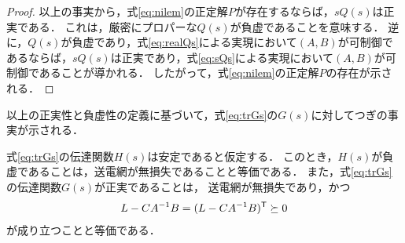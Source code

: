 \documentclass[a4j,10pt,oneside,openany,dvipdfmx]{jsbook}
\begin{document}
\begin{proof}
以上の事実から，式\eqref{eq:nilem}の正定解$P$が存在するならば，$sQ(s)$は正実である．
これは，厳密にプロパーな$Q(s)$が負虚であることを意味する．
逆に，$Q(s)$が負虚であり，式\eqref{eq:realQs}による実現において$(A,B)$が可制御であるならば，$sQ(s)$は正実であり，式\eqref{eq:sQs}による実現において$(A,B)$が可制御であることが導かれる．
したがって，式\eqref{eq:nilem}の正定解$P$の存在が示される．
\proofend
\end{proof}

以上の正実性と負虚性の定義に基づいて，式\eqref{eq:trGs}の$G(s)$に対してつぎの事実が示される．

\begin{theorem}\label{thm:EdynNI}
式\eqref{eq:trGs}の伝達関数$H(s)$は安定であると仮定する．
このとき，$H(s)$が負虚であることは，送電網が無損失であることと等価である．
また，式\eqref{eq:trGs}の伝達関数$G(s)$が正実であることは，
送電網が無損失であり，かつ
\begin{equation}\label{eq:pdsp}
L-CA^{-1}B = (L-CA^{-1}B)^{\sf T} \succeq 0
\end{equation}
が成り立つことと等価である．
\end{theorem}
\end{document}
